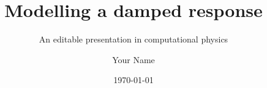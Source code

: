 \documentclass[10pt,aspectratio=169]{beamer}
\title[Damped response]{Modelling a damped response}
\subtitle{An editable presentation in computational physics}
\author[Your Name]{Your Name}
\institute{School of Physics, Peking University}
\date{\today}
\begin{document}
\begin{frame}[plain]\titlepage\end{frame}

\end{document}
